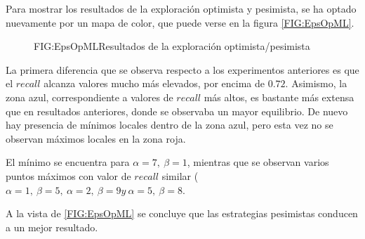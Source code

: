 Para mostrar los resultados de la exploración optimista y pesimista, se ha optado nuevamente por un mapa de color, que puede verse en la figura \ref{FIG:EpsOpML}.

\begin{figure}[Mapa de color de Thompson Sampling]{FIG:EpsOpML}{Resultados de la exploración optimista/pesimista}
\end{figure}

La primera diferencia que se observa respecto a los experimentos anteriores es que el $recall$ alcanza valores mucho más elevados, por encima de $0.72$. Asimismo, la zona azul, correspondiente a valores de $recall$ más altos, es bastante más extensa que en resultados anteriores, donde se observaba un mayor equilibrio. De nuevo hay presencia de mínimos locales dentro de la zona azul, pero esta vez no se observan máximos locales en la zona roja.

El mínimo se encuentra para $\alpha = 7, \ \beta = 1$, mientras que se observan varios puntos máximos con valor de $recall$ similar ($\alpha = 1, \ \beta = 5, \ \alpha = 2, \ \beta = 9 y \ \alpha = 5, \ \beta = 8$.

A la vista de \ref{FIG:EpsOpML} se concluye que las estrategias pesimistas conducen a un mejor resultado.